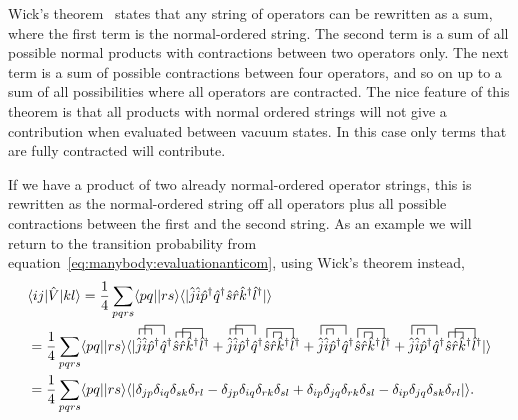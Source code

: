 Wick's theorem~\cite{PhysRev.80.268} states that any string of operators can be rewritten as a sum,
where the first term is the normal-ordered string.
The second term is a sum of all possible normal products with contractions between two operators only.
The next term is a sum of possible contractions between four operators, and so
on up to a sum of all possibilities where all operators are contracted.
The nice feature of this theorem is that all products with normal ordered
strings will not give a contribution when evaluated between vacuum states.
In this case only terms that are fully contracted will contribute.

If we have a product of two already normal-ordered operator strings, this is rewritten as the normal-ordered string off all operators plus all possible contractions between the first and the second string.
As an example we will return to the transition probability from
equation~\eqref{eq:manybody:evaluationanticom}, using Wick's theorem instead,
\begin{equation}
\begin{split}
\label{eq:manybody:evaluationwick}
&\langle ij|\hat{V}|kl \rangle = 
\frac{1}{4} \sum_{pqrs} \langle pq||rs \rangle 
\langle | \hat{j}\hat{i} 
\hat{p}^{\dagger} \hat{q}^{\dagger} \hat{s} \hat{r}
\hat{k}^{\dagger} \hat{l}^{\dagger} | \rangle \\
%
&= 
\frac{1}{4} \sum_{pqrs} \langle pq||rs \rangle \langle | 
\contraction[1ex]{}{\hat{j}}{\hat{i}}{ \hat{p}}
\contraction[1.6ex]{\hat{j}}{\hat{i}}{\hat{p}^{\dagger}}{\hat{q}}
\hat{j}\hat{i} \hat{p}^{\dagger} \hat{q}^{\dagger} 
\contraction[1ex]{}{\hat{s}}{\hat{r}}{\hat{k}}
\contraction[1.6ex]{\hat{s}}{\hat{r}}{\hat{k}^{\dagger}}{\hat{l}}
\hat{s} \hat{r}\hat{k}^{\dagger} \hat{l}^{\dagger} 
+
\contraction[1ex]{}{\hat{j}}{\hat{i}}{ \hat{p}}
\contraction[1.6ex]{\hat{j}}{\hat{i}}{\hat{p}^{\dagger}}{\hat{q}}
\hat{j}\hat{i} \hat{p}^{\dagger} \hat{q}^{\dagger} 
\contraction[1ex]{\hat{s}}{\hat{r}}{}{\hat{k}}
\contraction[1.6ex]{}{\hat{s}}{\hat{r}\hat{k}^{\dagger}}{\hat{l}}
\hat{s} \hat{r}\hat{k}^{\dagger} \hat{l}^{\dagger} 
+
\contraction[1ex]{\hat{j}}{\hat{i}}{}{ \hat{p}}
\contraction[1.6ex]{}{\hat{j}}{\hat{i}\hat{p}^{\dagger}}{\hat{q}}
\hat{j}\hat{i} \hat{p}^{\dagger} \hat{q}^{\dagger} 
\contraction[1ex]{\hat{s}}{\hat{r}}{}{\hat{k}}
\contraction[1.6ex]{}{\hat{s}}{\hat{r}\hat{k}^{\dagger}}{\hat{l}}
\hat{s} \hat{r}\hat{k}^{\dagger} \hat{l}^{\dagger} 
+
\contraction[1ex]{\hat{j}}{\hat{i}}{}{ \hat{p}}
\contraction[1.6ex]{}{\hat{j}}{\hat{i}\hat{p}^{\dagger}}{\hat{q}}
\hat{j}\hat{i} \hat{p}^{\dagger} \hat{q}^{\dagger} 
\contraction[1ex]{}{\hat{s}}{\hat{r}}{\hat{k}}
\contraction[1.6ex]{\hat{s}}{\hat{r}}{\hat{k}^{\dagger}}{\hat{l}}
\hat{s} \hat{r}\hat{k}^{\dagger} \hat{l}^{\dagger} 
| \rangle \\
%
&= 
\frac{1}{4} \sum_{pqrs} \langle pq||rs \rangle \langle |
 \delta_{jp} \delta_{iq} \delta_{sk} \delta_{rl}
- \delta_{jp} \delta_{iq} \delta_{rk} \delta_{sl}
+ \delta_{ip} \delta_{jq} \delta_{rk} \delta_{sl}
- \delta_{ip} \delta_{jq} \delta_{sk} \delta_{rl}
|\rangle .
%
\end{split}
\end{equation}
